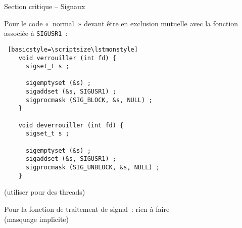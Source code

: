 \begin {frame} [fragile] {Section critique -- Signaux}

    Pour le code «~normal~» devant être en exclusion mutuelle avec
    la fonction associée à \texttt {SIGUSR1}~:

    \begin {lstlisting} [basicstyle=\scriptsize\lstmonstyle]
    void verrouiller (int fd) {
      sigset_t s ;

      sigemptyset (&s) ;
      sigaddset (&s, SIGUSR1) ;
      sigprocmask (SIG_BLOCK, &s, NULL) ;
    }

    void deverrouiller (int fd) {
      sigset_t s ;

      sigemptyset (&s) ;
      sigaddset (&s, SIGUSR1) ;
      sigprocmask (SIG_UNBLOCK, &s, NULL) ;
    }
    \end{lstlisting}
    (utiliser  pour des threads)

    Pour la fonction de traitement de signal~: rien à faire
    \\
    (masquage implicite)

\end{frame}
